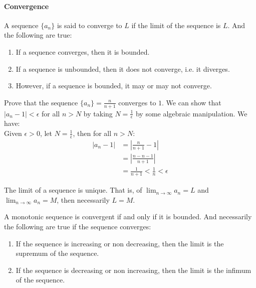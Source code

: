 \documentclass[11pt]{report}
\begin{document}
\paragraph{Convergence} A sequence $\{a_n\}$ is said to converge to $L$ if the limit of the sequence is $L$. And the following are true:
\begin{enumerate}
    \item If a sequence converges, then it is bounded.
    \item If a sequence is unbounded, then it does not converge, i.e. it diverges.
    \item However, if a sequence is bounded, it may or may not converge.
\end{enumerate}
\begin{example}
    Prove that the sequence $\{a_n\} = \frac{n}{n+1}$ converges to $1$. We can show that $|a_n - 1| < \epsilon$ for all $n > N$ by taking $N = \frac{1}{\epsilon}$ by some algebraic manipulation. We have:\\
    Given $\epsilon > 0$, let $N = \frac{1}{\epsilon}$, then for all $n > N$:
    \begin{align*}
        |a_n - 1| &= |\frac{n}{n+1} - 1| \\
        &= |\frac{n - n - 1}{n+1}| \\
        &= \frac{1}{n+1} < \frac{1}{n} < \epsilon
    \end{align*}
\end{example}
\begin{theorem}
    The limit of a sequence is unique. That is, of $\lim_{n \to \infty} a_n = L$ and $\lim_{n \to \infty} a_n = M$, then necessarily $L = M$.
\end{theorem}
\begin{theorem}
    A monotonic sequence is convergent if and only if it is bounded. And necessarily the following are true if the sequence converges:
    \begin{enumerate}
        \item If the sequence is increasing or non decreasing, then the limit is the supremum of the sequence.
        \item If the sequence is decreasing or non increasing, then the limit is the infimum of the sequence.
    \end{enumerate}
\end{theorem}
\end{document}
